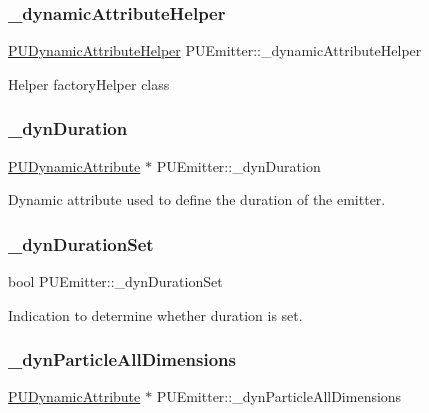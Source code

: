 \subsubsection{\texorpdfstring{\+\_\+dynamic\+Attribute\+Helper}{\_dynamicAttributeHelper}}
{\footnotesize\ttfamily \hyperlink{classPUDynamicAttributeHelper}{P\+U\+Dynamic\+Attribute\+Helper} P\+U\+Emitter\+::\+\_\+dynamic\+Attribute\+Helper\hspace{0.3cm}{\ttfamily [protected]}}

Helper factory\+Helper class \mbox{\label{classPUEmitter_adb41d33a1e421967b30ed75d57512bbb}} 
\subsubsection{\texorpdfstring{\+\_\+dyn\+Duration}{\_dynDuration}}
{\footnotesize\ttfamily \hyperlink{classPUDynamicAttribute}{P\+U\+Dynamic\+Attribute} $\ast$ P\+U\+Emitter\+::\+\_\+dyn\+Duration\hspace{0.3cm}{\ttfamily [protected]}}

Dynamic attribute used to define the duration of the emitter. \mbox{\label{classPUEmitter_a3ff02b7481e73cef48215b3258e9d12b}} 
\subsubsection{\texorpdfstring{\+\_\+dyn\+Duration\+Set}{\_dynDurationSet}}
{\footnotesize\ttfamily bool P\+U\+Emitter\+::\+\_\+dyn\+Duration\+Set\hspace{0.3cm}{\ttfamily [protected]}}

Indication to determine whether duration is set. \mbox{\label{classPUEmitter_aabd10ff89b173636ebe0be3e065f260e}} 
\subsubsection{\texorpdfstring{\+\_\+dyn\+Particle\+All\+Dimensions}{\_dynParticleAllDimensions}}
{\footnotesize\ttfamily \hyperlink{classPUDynamicAttribute}{P\+U\+Dynamic\+Attribute} $\ast$ P\+U\+Emitter\+::\+\_\+dyn\+Particle\+All\+Dimensions\hspace{0.3cm}{\ttfamily [protected]}}

